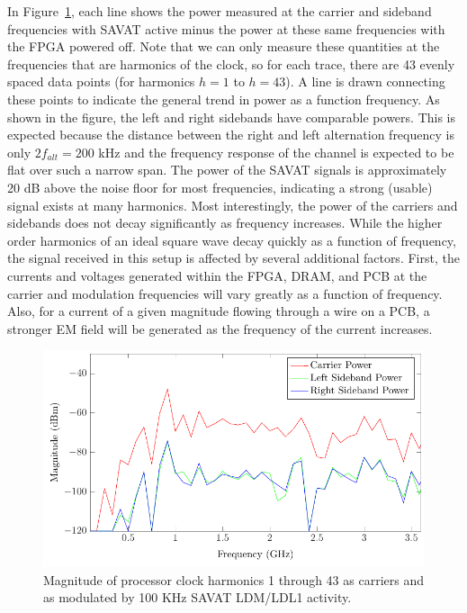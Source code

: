 In Figure~\ref{savat_harm_mag}, each line shows the power measured at the carrier and sideband frequencies with SAVAT active minus the power at these same frequencies with the FPGA powered off. Note that we can only measure these quantities at the frequencies that are harmonics of the clock, so for each trace, there are 43 evenly spaced data points (for harmonics $h = 1$ to $h = 43$). A line is drawn connecting these points to indicate the general trend in power as a function frequency. As shown in the figure, the left and right sidebands have comparable powers. This is expected because the distance between the right and left alternation frequency is only $2 f_{alt} = 200$ kHz and the frequency response of the channel is expected to be flat over such a narrow span. The power of the SAVAT signals is approximately 20 dB above the noise floor for most frequencies, indicating a strong (usable) signal exists at many harmonics. Most interestingly, the power of the carriers and sidebands does not decay significantly as frequency increases. While the higher order harmonics of an ideal square wave decay quickly as a function of frequency, the signal received in this setup is affected by several additional factors. First, the currents and voltages generated within the FPGA, DRAM, and PCB at the carrier and modulation frequencies will vary greatly as a function of frequency. Also, for a current of a given magnitude flowing through a wire on a PCB, a stronger EM field will be generated as the frequency of the current increases. 

\begin{figure}[hbt]
\includegraphics[width=5in]{savat_harm_mag}
\caption{Magnitude of processor clock harmonics 1 through 43 as carriers and as modulated by 100 KHz SAVAT LDM/LDL1 activity.}
\label{savat_harm_mag}
\end{figure}

